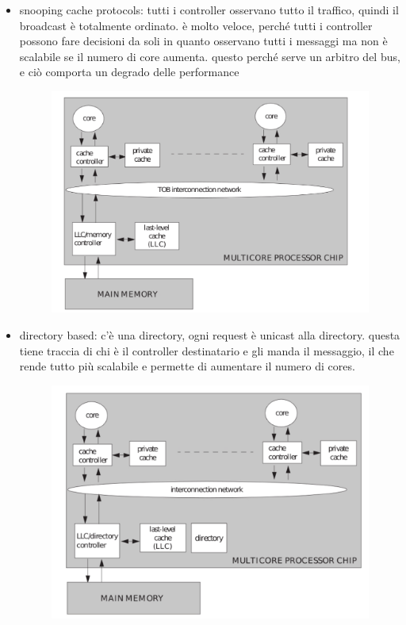 \documentclass[12pt, oneside]{extbook} %
\begin{document}
\begin{itemize}
\item snooping cache protocols: tutti i controller osservano tutto il traffico, quindi il broadcast è totalmente ordinato. è molto veloce, perché tutti i controller possono fare decisioni da soli in quanto osservano tutti i messaggi ma non è scalabile se il numero di core aumenta. questo perché serve un arbitro del bus, e ciò comporta un degrado delle performance\\
\begin{figure}[!h]
	\includegraphics[scale=0.3]{immagini/snooping.png}
\end{figure}
\item directory based: c'è una directory, ogni request è unicast alla directory. questa tiene traccia di chi è il controller destinatario e gli manda il messaggio, il che rende tutto più scalabile e permette di aumentare il numero di cores.\\
\begin{figure}[!h]
	\includegraphics[scale=0.3]{immagini/directory.png}
\end{figure}
\end{itemize}
\end{document}
